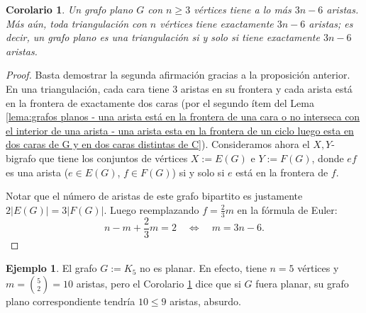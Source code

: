 \documentclass[12pt]{report}
\theoremstyle{plain}
\newtheorem{corollary}[theorem]{Corolario}
\theoremstyle{definition}
\newtheorem{example}[theorem]{Ejemplo}
\newcommand{\abs}[1]{\left \vert #1 \right \vert}
\begin{document}
\begin{corollary}\label{corolario:un grafo plano con n > 2 vertices tiene a lo mas 3n - 6 aristas}
Un grafo plano $G$ con $n \geq 3$ vértices tiene a lo más $3n - 6$ aristas. Más aún, toda triangulación con $n$ vértices tiene exactamente $3n-6$ aristas; es decir, un grafo plano es una triangulación si y solo si tiene exactamente $3n-6$ aristas.
\end{corollary}
\begin{proof}
Basta demostrar la segunda afirmación gracias a la proposición anterior. En una triangulación, cada cara tiene $3$ aristas en su frontera y cada arista está en la frontera de exactamente dos caras (por el segundo ítem del Lema \ref{lema:grafos planos - una arista está en la frontera de una cara o no interseca con el interior de una arista - una arista esta en la frontera de un ciclo luego esta en dos caras de G y en dos caras distintas de C}). Consideramos ahora el $X,Y$-bigrafo que tiene los conjuntos de vértices $X := E(G)$ e $Y := F (G)$, donde $ef$ es una arista ($e \in E(G)$, $f \in F (G)$) si y solo si $e$ está en la frontera de $f$.


Notar que el número de aristas de este grafo bipartito es justamente $2 \abs {E(G)} = 3 \abs{F(G)}$. Luego reemplazando $f = \frac 2 3 m$ en la fórmula de Euler:
\[
    n - m + \frac 2 3 m = 2 \quad \Leftrightarrow \quad m = 3 n - 6.
\]
\end{proof}





\begin{example}
El grafo $G := K_5$ no es planar. En efecto, tiene $n= 5$ vértices y $m = \binom 5 2 = 10$ aristas, pero el Corolario \ref{corolario:un grafo plano con n > 2 vertices tiene a lo mas 3n - 6 aristas} dice que si $G$ fuera planar, su grafo plano correspondiente tendría $10 \leq 9$ aristas, absurdo.
\end{example}
\end{document}
